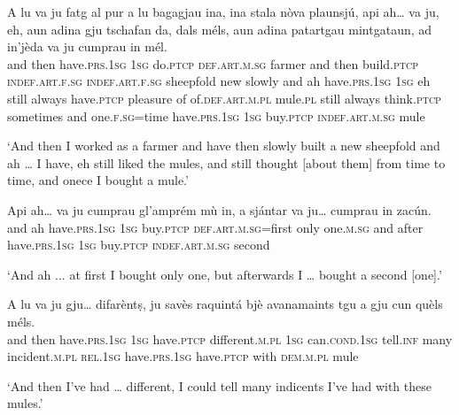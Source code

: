 \begin{linenumbers}
\gll A lu va ju fatg al pur a lu bagagjau ina, ina stala nòva plaunsjú, api ah… va ju, eh, aun adina gju tschafan da, dals méls, aun adina patartgau mintgataun, ad in’jèda va ju cumprau in mél.   \\
and then have.\textsc{prs.1sg} \textsc{1sg} do.\textsc{ptcp} \textsc{def.art.m.sg} farmer and then build.\textsc{ptcp} \textsc{indef.art.f.sg} \textsc{indef.art.f.sg} sheepfold new slowly and ah have.\textsc{prs.1sg}  \textsc{1sg} eh still always have.\textsc{ptcp} pleasure of  of.\textsc{def.art.m.pl} mule.\textsc{pl} still always think.\textsc{ptcp} sometimes and one.\textsc{f.sg}=time have.\textsc{prs.1sg} \textsc{1sg}  buy.\textsc{ptcp} \textsc{indef.art.m.sg} mule \\
\end{linenumbers}
\medskip
\glt `And then I worked as a farmer and have then slowly built a new sheepfold and ah … I have, eh still liked the mules, and still thought [about them] from time to time, and onece I bought a mule.'
\medskip

\begin{linenumbers}
\gll  Api ah… va ju cumprau gl’amprém mù in, a sjántar va ju… cumprau in zacún.  \\
and ah have.\textsc{prs.1sg} \textsc{1sg} buy.\textsc{ptcp} \textsc{def.art.m.sg=}first only one.\textsc{m.sg} and after  have.\textsc{prs.1sg} \textsc{1sg} buy.\textsc{ptcp}  \textsc{indef.art.m.sg} second\\
\end{linenumbers}
\medskip
\glt `And ah ... at first I bought only one, but afterwards I … bought a second [one].'
\medskip

\begin{linenumbers}
\gll  A lu va ju gju… difarèntṣ, ju savès raquintá bjè avanamaints tgu a gju cun quèls méls.  \\
and then  have.\textsc{prs.1sg} \textsc{1sg} have.\textsc{ptcp} different.\textsc{m.pl}  \textsc{1sg} can.\textsc{cond.1sg} tell.\textsc{inf} many incident.\textsc{m.pl} \textsc{rel.1sg} have.\textsc{prs.1sg} have.\textsc{ptcp} with \textsc{dem.m.pl}  mule\\
\end{linenumbers}
\medskip
\glt `And then I’ve had … different, I could tell many indicents I’ve had with these mules.'
\medskip

